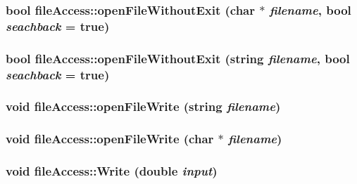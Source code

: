 \label{classfile_access_a9ae5080911deee1e5835f32cabf1f995}
\hypertarget{classfile_access_af641cf749d3f1fcc48bf18c4b9bee630}{
\subsubsection[{openFileWithoutExit}]{\setlength{\rightskip}{0pt plus 5cm}bool fileAccess::openFileWithoutExit (char $\ast$ {\em filename}, \/  bool {\em seachback} = {\ttfamily true})}}
\label{classfile_access_af641cf749d3f1fcc48bf18c4b9bee630}
\hypertarget{classfile_access_a1b06d07c8fb0c7840ecf8c116f3b23ae}{
\subsubsection[{openFileWithoutExit}]{\setlength{\rightskip}{0pt plus 5cm}bool fileAccess::openFileWithoutExit (string {\em filename}, \/  bool {\em seachback} = {\ttfamily true})}}
\label{classfile_access_a1b06d07c8fb0c7840ecf8c116f3b23ae}
\hypertarget{classfile_access_a2a12db6db45d3520a82e7dec49723121}{
\subsubsection[{openFileWrite}]{\setlength{\rightskip}{0pt plus 5cm}void fileAccess::openFileWrite (string {\em filename})}}
\label{classfile_access_a2a12db6db45d3520a82e7dec49723121}
\hypertarget{classfile_access_a524de46eb27d5f5397c67befbf5bdd62}{
\subsubsection[{openFileWrite}]{\setlength{\rightskip}{0pt plus 5cm}void fileAccess::openFileWrite (char $\ast$ {\em filename})}}
\label{classfile_access_a524de46eb27d5f5397c67befbf5bdd62}
\hypertarget{classfile_access_ab759f81ea15751aab3aa7ffc1bcb6162}{
\subsubsection[{Write}]{\setlength{\rightskip}{0pt plus 5cm}void fileAccess::Write (double {\em input})}}
